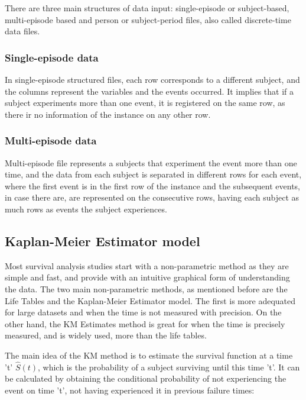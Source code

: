 \documentclass[11pt]{article} %
\begin{document}
      There are three main structures of data input: single-episode or subject-based, multi-episode based and person or subject-period files, also called discrete-time data files.

      \subsubsection*{Single-episode data}

        In single-episode structured files, each row corresponds to a different subject, and the columns represent the variables and the events occurred. It implies that if a subject experiments more than one event, it is registered on the same row, as there ir no information of the instance on any other row.

      \subsubsection*{Multi-episode data}

        Multi-episode file represents a subjects that experiment the event more than one time, and the data from each subject is separated in different rows for each event, where the first event is in the first row of the instance and the subsequent events, in case there are, are represented on the consecutive rows, having each subject as much rows as events the subject experiences.

  \subsection{Kaplan-Meier Estimator model}

    Most survival analysis studies start with a non-parametric method as they are simple and fast, and provide with an intuitive graphical form of understanding the data. The two main non-parametric methods, as mentioned before are the Life Tables and the Kaplan-Meier Estimator model. The first is more adequated for large datasets and when the time is not measured with precision. On the other hand, the KM Estimates method is great for when the time is precisely measured, and is widely used, more than the life tables.

    The main idea of the KM method is to estimate the survival function at a time 't' $\hat{S}(t)$, which is the probability of a subject surviving until this time 't'. It can be calculated by obtaining the conditional probability of not experiencing the event on time 't', not having experienced it in previous failure times:
\end{document}
